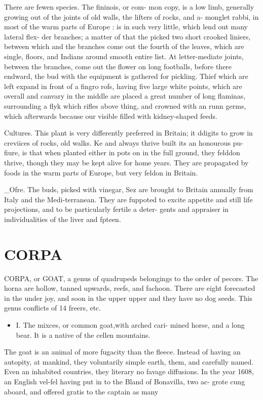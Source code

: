 \documentclass{article}
\begin{document}
There are fewen species. The fininois, or com- mon copy, is a low limb, generally growing out of the joints of old walls, the lifters of rocks, and a- monglet rabbi, in most of the warm parts of Europe : is in such very little, which lend out many lateral flex- der branches; a matter of that the picked two short crooked liniers, between which and the branches come out the fourth of the leaves, which are single, floors, and Indians around smooth entire list. At letter-mediate joints, between the branches, come out the flower on long footballs, before there endward, the bud with the equipment is gathered for pickling. Thief which are left expand in front of a fingro rofs, having five large white points, which are overall and canvary in the middle are placed a great number of long flaminas, surrounding a flyk which rifles above thing, and crowned with an runn germs, which afterwards because our visible filled with kidney-shaped feeds.

Cultures. This plant is very differently preferred in Britain; it ddigits to grow in creviices of rocks, old walks. Ke and always thrive built its an honourous pu- fiure, is that when planted either in pots on in the full ground, they felddon thrive, though they may be kept alive for home years. They are propagated by foods in the warm parts of Europe, but very feldon in Britain.

\_Ofre. The buds, picked with vinegar, Sez are brought to Britain annually from Italy and the Medi-terranean. They are fuppoted to excite appetite and still life projections, and to be particularly fertile a deter- gents and appraiser in individualities of the liver and fpteen.

\section*{CORPA}
CORPA, or GOAT, a genus of quadrupeds belongings to the order of pecors. The horna are hollow, tanned upwards, reefs, and fachoon. There are eight forecasted in the under joy, and soon in the upper upper and they have no dog seeds. This genus conflicts of 14 freers, etc.

\begin{itemize}
\item I. The mixces, or common goat,with arched cari- mined horse, and a long bear. It is a native of the cellen mountains.
\end{itemize}
The goat is an animal of more fugacity than the fleece. Instead of having an autopity, at mankind, they voluntarily simple earth, them, and carefully named. Even an inhabited countries, they literary no favage diffusions. In the year 1608, an English vel-fel having put in to the Bland of Bonavilla, two ac- grote cung aboard, and offered gratis to the captain as many
\end{document}
